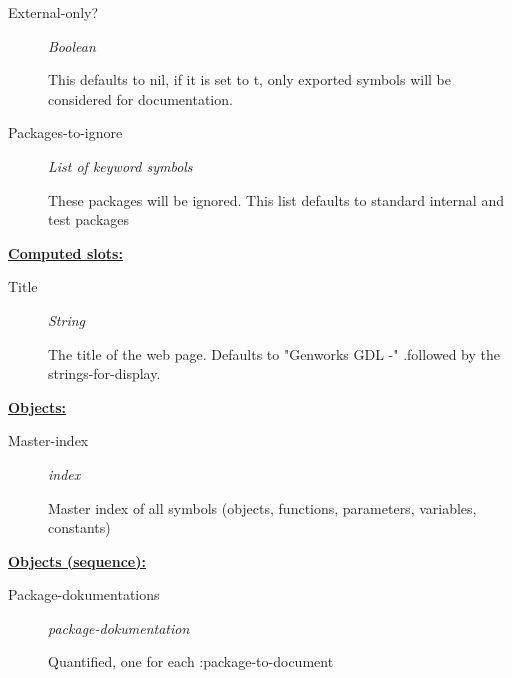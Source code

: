 \documentclass [11pt]{book}
\begin{document}
\begin{itemize}
\begin{description}
\item [External-only?]
\emph{Boolean}

 This defaults to nil, if it is set to t, only exported symbols will be
considered for documentation.




\item [Packages-to-ignore]
\emph{List of keyword symbols}

 These packages will be ignored.
This list defaults to standard internal and test packages




\end{description}






\textbf{
\underline{Computed slots:}}

\begin{description}

\item [Title]
\emph{String}

 The title of the web page. Defaults to "Genworks GDL -"
.followed by the strings-for-display.




\end{description}






\textbf{
\underline{Objects:}}

\begin{description}

\item [Master-index]
\emph{index}

 Master index of all symbols (objects, functions, parameters, variables, constants)




\end{description}






\textbf{
\underline{Objects (sequence):}}

\begin{description}

\item [Package-dokumentations]
\emph{package-dokumentation}

 Quantified, one for each :package-to-document





\end{description}
\end{itemize}
\end{document}
